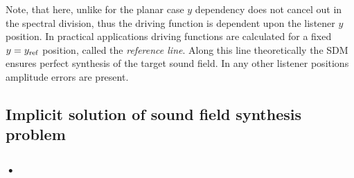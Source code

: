 Note, that here, unlike for the planar case $y$ dependency does not cancel out in the spectral division, thus the driving function is dependent upon the listener $y$ position.
In practical applications driving functions are calculated for a fixed $y = y_{\mathrm{ref}}$ position, called the \emph{reference line}. Along this line theoretically the SDM ensures perfect synthesis of the target sound field. In any other listener positions amplitude errors are present.
%
%
%

\subsection{Implicit solution of sound field synthesis problem}

\subsubsection{•}